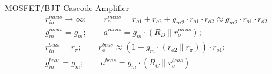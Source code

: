 \documentclass[11pt]{article}
\begin{document}
\begin{sectionbox}{MOSFET/BJT Cascode Amplifier}
\begin{align*}
& r_{in}^{mcas} \rightarrow \infty; \qquad
  r_o^{mcas} = r_{o1} + r_{o2} + g_{m2} \cdot r_{o1} \cdot r_{o2} \approx 
  g_{m2} \cdot r_{o1} \cdot r_{o2} \\[0.2em]
& g_m^{mcas} = g_{m}; \qquad
  a^{mcas} = g_{m} \cdot \left( R_D \, \big|\big| \; r_o^{mcas} \right); \\[1.5em]
& r_{in}^{bcas} = r_{\pi}; \qquad
  r_o^{bcas} \approx \left( 1 + g_m \cdot \left( r_{o2} \, \big|\big| \; r_{\pi} \right) \right) \cdot r_{o1}; \\[0.2em]
& g_m^{bcas} = g_{m}; \qquad
  a^{bcas} = g_{m} \cdot \left( R_C \, \big|\big| \; r_o^{bcas} \right)
\end{align*}
\end{sectionbox}
\end{document}
